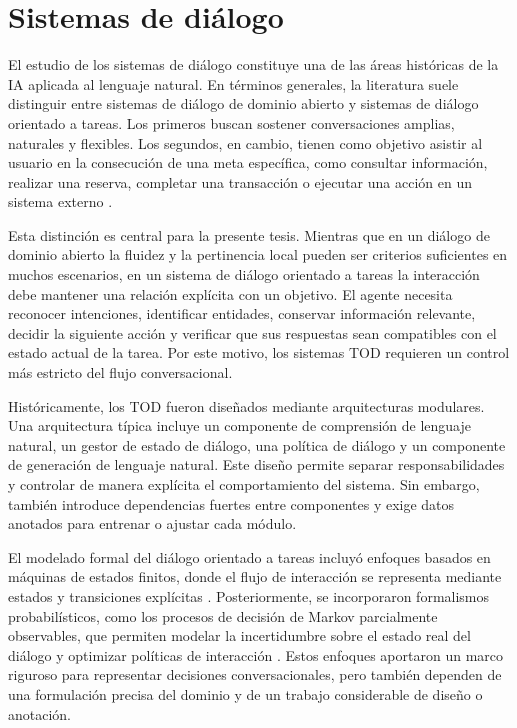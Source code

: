 \section{Sistemas de diálogo}

El estudio de los sistemas de diálogo constituye una de las áreas históricas de la
\ac{IA} aplicada al lenguaje natural. En términos generales, la literatura suele distinguir
entre sistemas de diálogo de dominio abierto y sistemas de diálogo orientado a tareas.
Los primeros buscan sostener conversaciones amplias, naturales y flexibles. Los segundos,
en cambio, tienen como objetivo asistir al usuario en la consecución de una meta
específica, como consultar información, realizar una reserva, completar una transacción
o ejecutar una acción en un sistema externo \citep{chen2017survey,gao2019neural,
williams2013dialog,young2013pomdp}.

Esta distinción es central para la presente tesis. Mientras que en un diálogo de dominio
abierto la fluidez y la pertinencia local pueden ser criterios suficientes en muchos
escenarios, en un sistema de diálogo orientado a tareas la interacción debe mantener
una relación explícita con un objetivo. El agente necesita reconocer intenciones,
identificar entidades, conservar información relevante, decidir la siguiente acción y
verificar que sus respuestas sean compatibles con el estado actual de la tarea. Por este
motivo, los sistemas \ac{TOD} requieren un control más estricto del flujo conversacional.

Históricamente, los \ac{TOD} fueron diseñados mediante arquitecturas modulares. Una
arquitectura típica incluye un componente de comprensión de lenguaje natural, un
gestor de estado de diálogo, una política de diálogo y un componente de generación de
lenguaje natural. Este diseño permite separar responsabilidades y controlar de manera
explícita el comportamiento del sistema. Sin embargo, también introduce dependencias
fuertes entre componentes y exige datos anotados para entrenar o ajustar cada módulo.

El modelado formal del diálogo orientado a tareas incluyó enfoques basados en
máquinas de estados finitos, donde el flujo de interacción se representa mediante
estados y transiciones explícitas \citep{levin2000stochastic}. Posteriormente, se
incorporaron formalismos probabilísticos, como los procesos de decisión de Markov
parcialmente observables, que permiten modelar la incertidumbre sobre el estado real
del diálogo y optimizar políticas de interacción \citep{young2010hidden,
williams2007pomdp}. Estos enfoques aportaron un marco riguroso para representar
decisiones conversacionales, pero también dependen de una formulación precisa del
dominio y de un trabajo considerable de diseño o anotación.


